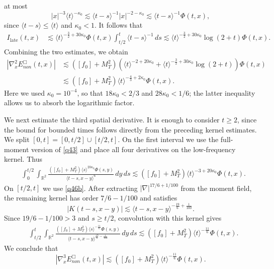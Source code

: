 \documentclass[reqno,11pt]{amsart}
\numberwithin{equation}{section}
\begin{document}
at most
\begin{equation*}
|x|^{-3}\langle t\rangle^{-\kappa_0}
\lesssim
\langle t-s\rangle^{-1}|x|^{-2-\kappa_0}
\lesssim
\langle t-s\rangle^{-1}\Phi(t,x),
\end{equation*}
since $\langle t-s\rangle\leq\langle t\rangle$ and
$\kappa_0<1$.
It follows that
\begin{align*}
I_{\mathrm{late}}(t,x)
&\lesssim
\langle t\rangle^{-\frac32+30\kappa_0}\Phi(t,x)
\int_{t/2}^t\langle t-s\rangle^{-1}\,ds\lesssim
\langle t\rangle^{-\frac32+30\kappa_0}
\log(2+t)\Phi(t,x).
\end{align*}
Combining the two estimates, we obtain
\begin{align}
|\nabla_x^2E^\Box_{non}(t,x)|
&\lesssim ([f_0]+M_T^2)
\left(
\langle t\rangle^{-2+20\kappa_0}
+\langle t\rangle^{-\frac32+30\kappa_0}\log(2+t)
\right)\Phi(t,x)\nonumber\\
&\lesssim ([f_0]+M_T^2)
\langle t\rangle^{-\frac43+2\kappa_0}\Phi(t,x).
\label{section6-osc-two}
\end{align}
Here we used $\kappa_0=10^{-4}$, so that $18\kappa_0<2/3$ and
$28\kappa_0<1/6$; the latter inequality allows us to absorb the
logarithmic factor.


We next estimate the third spatial derivative. It is enough to consider
$t\geq2$, since the bound for bounded times follows directly from the
preceding kernel estimates. We split $[0,t]=[0,t/2]\cup[t/2,t]$. On the
first interval we use the full-moment version of \eqref{q43} and place all
four derivatives on the low-frequency kernel. Thus
\begin{align*}
&\int_0^{t/2}\!\!\int_{\mathbb R^2}
\frac{([f_0]+M_T^2)\langle s\rangle^{20\kappa_0}\Phi(s,y)}
{\langle t-s,x-y\rangle^6}\,dy\,ds\lesssim([f_0]+M_T^2)
\langle t\rangle^{-3+20\kappa_0}\Phi(t,x).
\end{align*}
On $[t/2,t]$ we use \eqref{q46b}. After extracting
$|\nabla|^{17/6+1/100}$ from the moment field, the remaining kernel has
order $7/6-1/100$ and satisfies
\[
|K(t-s,x-y)|
\lesssim\langle t-s,x-y\rangle^{-\frac{19}{6}+\frac1{100}}.
\]
Since $19/6-1/100>3$ and $s\geq t/2$, convolution with this kernel gives
\begin{align*}
&\int_{t/2}^t\!\!\int_{\mathbb R^2}
\frac{([f_0]+M_T^2)\langle s\rangle^{-\frac{11}{6}}\Phi(s,y)}
{\langle t-s,x-y\rangle^{\frac{19}{6}-\frac1{100}}}\,dy\,ds\lesssim([f_0]+M_T^2)
\langle t\rangle^{-\frac{11}{6}}\Phi(t,x).
\end{align*}
We conclude that
\begin{equation}\label{section6-osc-three}
|\nabla_x^3E^\Box_{non}(t,x)|
\lesssim([f_0]+M_T^2)
\langle t\rangle^{-\frac{11}{6}}\Phi(t,x).
\end{equation}
\end{document}

